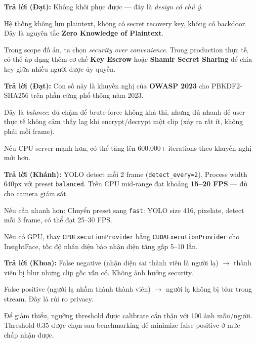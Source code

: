 \documentclass[12pt, a4paper]{article}
\begin{document}
\begin{tcolorbox}[colback=gray!5, colframe=MidnightBlue, title=\textbf{Q2: Nếu admin quên mật khẩu thì sao?},
  breakable]
\textbf{Trả lời (Đạt):}
Không khôi phục được --- đây là \textit{design có chủ ý}.

Hệ thống không lưu plaintext, không có secret recovery key, không có backdoor.
Đây là nguyên tắc \textbf{Zero Knowledge of Plaintext}.

Trong scope đồ án, ta chọn \textit{security over convenience}.
Trong production thực tế, có thể áp dụng thêm cơ chế
\textbf{Key Escrow} hoặc \textbf{Shamir Secret Sharing}
để chia key giữa nhiều người được ủy quyền.
\end{tcolorbox}

\begin{tcolorbox}[colback=gray!5, colframe=MidnightBlue, title=\textbf{Q3: Tại sao 390.000 iterations, không phải nhiều hơn?},
  breakable]
\textbf{Trả lời (Đạt):}
Con số này là khuyến nghị của \textbf{OWASP 2023} cho PBKDF2-SHA256
trên phần cứng phổ thông năm 2023.

Đây là \textit{balance}: đủ chậm để brute-force không khả thi,
nhưng đủ nhanh để user thực tế không cảm thấy lag khi encrypt/decrypt
một clip (xảy ra rất ít, không phải mỗi frame).

Nếu CPU server mạnh hơn, có thể tăng lên 600.000+ iterations
theo khuyến nghị mới hơn.
\end{tcolorbox}

\begin{tcolorbox}[colback=gray!5, colframe=MidnightBlue, title=\textbf{Q4: Real-time có bị lag không? FPS bao nhiêu?},
  breakable]
\textbf{Trả lời (Khánh):}
YOLO detect mỗi 2 frame (\texttt{detect\_every=2}).
Process width 640px với preset \texttt{balanced}.
Trên CPU mid-range đạt khoảng \textbf{15--20 FPS} --- đủ cho camera giám sát.

Nếu cần nhanh hơn:
Chuyển preset sang \texttt{fast}: YOLO size 416, pixelate, detect mỗi 3 frame,
có thể đạt 25--30 FPS.

Nếu có GPU, thay \texttt{CPUExecutionProvider} bằng \texttt{CUDAExecutionProvider}
cho InsightFace, tốc độ nhân diện bào nhận diện tăng gấp 5--10 lần.
\end{tcolorbox}

\begin{tcolorbox}[colback=gray!5, colframe=MidnightBlue, title=\textbf{Q5: Nhận diện nhầm thì sao? Privacy leakage?},
  breakable]
\textbf{Trả lời (Khoa):}
False negative (nhận diện sai thành viên là người lạ) $\rightarrow$
thành viên bị blur nhưng clip gốc vẫn có.
Không ảnh hưởng security.

False positive (người lạ nhầm thành thành viên) $\rightarrow$
người lạ không bị blur trong stream.
Đây là rủi ro privacy.

Để giảm thiểu, ngưỡng threshold được calibrate cẩn thận với 100 ảnh mẫu/người.
Threshold 0.35 được chọn sau benchmarking
để minimize false positive ở mức chấp nhận được.
\end{tcolorbox}
\end{document}
